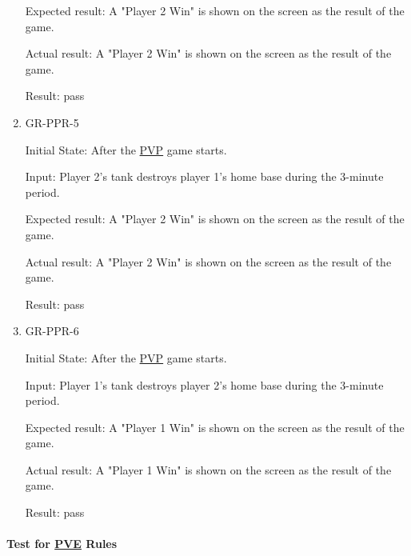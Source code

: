 \documentclass[12pt, titlepage]{article}
\begin{document}
\begin{enumerate}
Expected result: A "Player 2 Win" is shown on the screen as the result of the game.
					
Actual result: A "Player 2 Win" is shown on the screen as the result of the game.

Result: pass

\item{GR-PPR-5\\}
					
Initial State: After the \underline{PVP} game starts.
					
Input: Player 2's tank destroys player 1's home base during the 3-minute period.
					
Expected result: A "Player 2 Win" is shown on the screen as the result of the game.
					
Actual result: A "Player 2 Win" is shown on the screen as the result of the game.

Result: pass

\item{GR-PPR-6\\}
					
Initial State: After the \underline{PVP} game starts.
					
Input: Player 1's tank destroys player 2's home base during the 3-minute period.
					
Expected result: A "Player 1 Win" is shown on the screen as the result of the game.
					
Actual result: A "Player 1 Win" is shown on the screen as the result of the game.

Result: pass

\end{enumerate}

\paragraph{Test for \underline{PVE} Rules}
\end{document}
